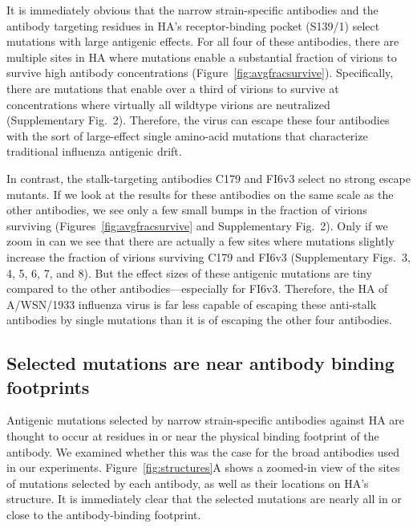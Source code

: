 \documentclass[11pt]{article}
\begin{document}
It is immediately obvious that the narrow strain-specific antibodies and the antibody targeting residues in HA's receptor-binding pocket (S139/1) select mutations with large antigenic effects.
For all four of these antibodies, there are multiple sites in HA where mutations enable a substantial fraction of virions to survive high antibody concentrations (Figure~\ref{fig:avgfracsurvive}).
Specifically, there are mutations that enable over a third of virions to survive at concentrations where virtually all wildtype virions are neutralized (Supplementary Fig.~2).
Therefore, the virus can escape these four antibodies with the sort of large-effect single amino-acid mutations that characterize traditional influenza antigenic drift\cite{yewdell1979antigenic,webster1980determination,koel2013substitutions,chambers2015identification,petrie2016antibodies,neher2016prediction}.  

In contrast, the stalk-targeting antibodies C179 and FI6v3 select no strong escape mutants. 
If we look at the results for these antibodies on the same scale as the other antibodies, we see only a few small bumps in the fraction of virions surviving (Figures~\ref{fig:avgfracsurvive} and Supplementary Fig.~2).
Only if we zoom in can we see that there are actually a few sites where mutations slightly increase the fraction of virions surviving C179 and FI6v3 (Supplementary Figs.~3, 4, 5, 6, 7, and 8).
But the effect sizes of these antigenic mutations are tiny compared to the other antibodies---especially for FI6v3.
Therefore, the HA of A/WSN/1933 influenza virus is far less capable of escaping these anti-stalk antibodies by single mutations than it is of escaping the other four antibodies. 

\subsection*{Selected mutations are near antibody binding footprints}
Antigenic mutations selected by narrow strain-specific antibodies against HA are thought to occur at residues in or near the physical binding footprint of the antibody\cite{yewdell1979antigenic,webster1980determination,caton1982antigenic}.
We examined whether this was the case for the broad antibodies used in our experiments.
Figure~\ref{fig:structures}A shows a zoomed-in view of the sites of mutations selected by each antibody, as well as their locations on HA's structure. 
It is immediately clear that the selected mutations are nearly all in or close to the antibody-binding footprint.
\end{document}

